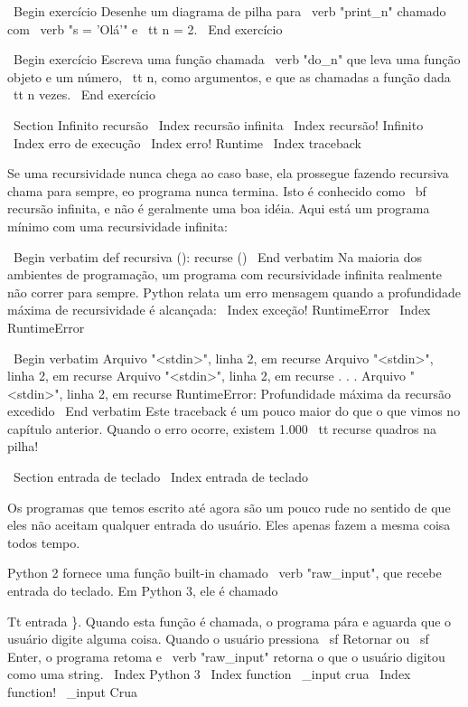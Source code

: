 \documentclass[10pt]{book}
\begin{document}
{{\ Begin {} exercício
Desenhe um diagrama de pilha para \ verb "print_n" chamado com
\ verb "s = 'Olá'" e {\ tt n = 2}.
\ End {} exercício

\ Begin {} exercício
Escreva uma função chamada \ verb "do_n" que leva uma função
objeto e um número, {\ tt n}, como argumentos, e que as chamadas
a função dada {\ tt n} vezes.
\ End {} exercício



\ Section {Infinito recursão}
\ Index {recursão infinita}
\ Index {recursão! Infinito}
\ Index {erro de execução}
\ Index {erro! Runtime}
\ Index {} traceback

Se uma recursividade nunca chega ao caso base, ela prossegue fazendo
recursiva chama para sempre, eo programa nunca termina. Isto é
conhecido como {\ bf recursão infinita}, e não é geralmente
uma boa idéia. Aqui está um programa mínimo com uma recursividade infinita:

\ Begin {verbatim}
def recursiva ():
    recurse ()
\ End {verbatim}
%
Na maioria dos ambientes de programação, um programa com recursividade infinita
realmente não correr para sempre. Python relata um erro
mensagem quando a profundidade máxima de recursividade é alcançada:
\ Index {exceção! RuntimeError}
\ Index {} RuntimeError

\ Begin {verbatim}
  Arquivo "<stdin>", linha 2, em recurse
  Arquivo "<stdin>", linha 2, em recurse
  Arquivo "<stdin>", linha 2, em recurse
                  .   
                  .
                  .
  Arquivo "<stdin>", linha 2, em recurse
RuntimeError: Profundidade máxima da recursão excedido
\ End {verbatim}
%
Este traceback é um pouco maior do que o que vimos no
capítulo anterior. Quando o erro ocorre, existem 1.000
{\ tt recurse} quadros na pilha!


\ Section {entrada de teclado}
\ Index {entrada de teclado}

Os programas que temos escrito até agora são um pouco rude no sentido de que
eles não aceitam qualquer entrada do usuário. Eles apenas fazem a mesma coisa todos
tempo.

Python 2 fornece uma função built-in chamado \ verb "raw_input", que recebe
entrada do teclado. Em Python 3, ele é chamado
  {Tt entrada \}. Quando esta função é chamada, o programa pára e
aguarda que o usuário digite alguma coisa. Quando o usuário pressiona {\ sf
  Retornar} ou {\ sf Enter}, o programa retoma e \ verb "raw_input"
retorna o que o usuário digitou como uma string.
\ Index {Python 3}
\ Index {function \ _input crua}
\ Index {function! \ _input Crua}

}}}
\end{document}
